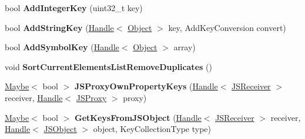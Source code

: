 \begin{DoxyCompactItemize}
\item 
bool {\bfseries Add\+Integer\+Key} (uint32\+\_\+t key)\hypertarget{classv8_1_1internal_1_1_b_a_s_e___e_m_b_e_d_d_e_d_a975afe9cd9160a3db791e49141001f12}{}\label{classv8_1_1internal_1_1_b_a_s_e___e_m_b_e_d_d_e_d_a975afe9cd9160a3db791e49141001f12}

\item 
bool {\bfseries Add\+String\+Key} (\hyperlink{classv8_1_1internal_1_1_handle}{Handle}$<$ \hyperlink{classv8_1_1internal_1_1_object}{Object} $>$ key, Add\+Key\+Conversion convert)\hypertarget{classv8_1_1internal_1_1_b_a_s_e___e_m_b_e_d_d_e_d_a4b74cce3641f25b92ebc6feaa0acf2f6}{}\label{classv8_1_1internal_1_1_b_a_s_e___e_m_b_e_d_d_e_d_a4b74cce3641f25b92ebc6feaa0acf2f6}

\item 
bool {\bfseries Add\+Symbol\+Key} (\hyperlink{classv8_1_1internal_1_1_handle}{Handle}$<$ \hyperlink{classv8_1_1internal_1_1_object}{Object} $>$ array)\hypertarget{classv8_1_1internal_1_1_b_a_s_e___e_m_b_e_d_d_e_d_af493f88f84435e67756ed5d90e13e983}{}\label{classv8_1_1internal_1_1_b_a_s_e___e_m_b_e_d_d_e_d_af493f88f84435e67756ed5d90e13e983}

\item 
void {\bfseries Sort\+Current\+Elements\+List\+Remove\+Duplicates} ()\hypertarget{classv8_1_1internal_1_1_b_a_s_e___e_m_b_e_d_d_e_d_a547f94424683169a94fe77a0c49793b8}{}\label{classv8_1_1internal_1_1_b_a_s_e___e_m_b_e_d_d_e_d_a547f94424683169a94fe77a0c49793b8}

\item 
\hyperlink{classv8_1_1_maybe}{Maybe}$<$ bool $>$ {\bfseries J\+S\+Proxy\+Own\+Property\+Keys} (\hyperlink{classv8_1_1internal_1_1_handle}{Handle}$<$ \hyperlink{classv8_1_1internal_1_1_j_s_receiver}{J\+S\+Receiver} $>$ receiver, \hyperlink{classv8_1_1internal_1_1_handle}{Handle}$<$ \hyperlink{classv8_1_1internal_1_1_j_s_proxy}{J\+S\+Proxy} $>$ proxy)\hypertarget{classv8_1_1internal_1_1_b_a_s_e___e_m_b_e_d_d_e_d_a443d471f5bd360885279aa761d2a4f4d}{}\label{classv8_1_1internal_1_1_b_a_s_e___e_m_b_e_d_d_e_d_a443d471f5bd360885279aa761d2a4f4d}

\item 
\hyperlink{classv8_1_1_maybe}{Maybe}$<$ bool $>$ {\bfseries Get\+Keys\+From\+J\+S\+Object} (\hyperlink{classv8_1_1internal_1_1_handle}{Handle}$<$ \hyperlink{classv8_1_1internal_1_1_j_s_receiver}{J\+S\+Receiver} $>$ receiver, \hyperlink{classv8_1_1internal_1_1_handle}{Handle}$<$ \hyperlink{classv8_1_1internal_1_1_j_s_object}{J\+S\+Object} $>$ object, Key\+Collection\+Type type)\hypertarget{classv8_1_1internal_1_1_b_a_s_e___e_m_b_e_d_d_e_d_a58eff2393484011483ae6db31013ec07}{}\label{classv8_1_1internal_1_1_b_a_s_e___e_m_b_e_d_d_e_d_a58eff2393484011483ae6db31013ec07}


\end{DoxyCompactItemize}
